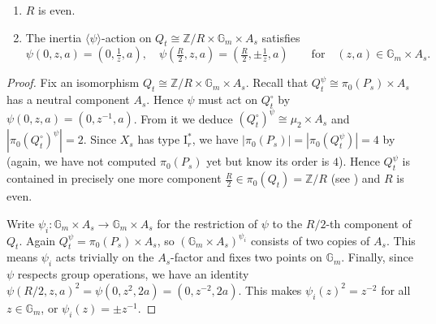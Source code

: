 \documentclass[reqno, letterpaper]{amsart}
\numberwithin{equation}{subsection}
\let\to\longrightarrow
\newcommand{\GG}{\mathbb{G}}
\newcommand{\ZZ}{\mathbb{Z}}
\begin{document}
			\begin{corollary} \label{cor:semistable reduction theorem:psi-action on neutral}
				\begin{enumerate}
					\item $R$ is even.
					\item The inertia $\langle \psi \rangle$-action on $Q_t \cong \ZZ/R \times \GG_m \times A_s$ satisfies
					\[ \psi(0,z,a) = (0,\tfrac{1}{z},a) ,\quad \psi(\tfrac{R}{2},z,a) = (\tfrac{R}{2},\pm \tfrac{1}{z},a) \qquad\mbox{for}\quad (z,a) \in \GG_m \times A_s .\]
				\end{enumerate}
			\end{corollary}
			\begin{proof}
				Fix an isomorphism $Q_t \cong \ZZ/R \times \GG_m \times A_s$. Recall that $Q_t^\psi \cong \pi_0(P_s) \times A_s$ has a neutral component $A_s$. Hence $\psi$ must act on $Q_t^\circ$ by $\psi(0,z,a) = (0,z^{-1},a)$. From it we deduce $(Q_t^\circ)^\psi \cong \mu_2 \times A_s$ and $|\pi_0(Q_t^\circ)^\psi| = 2$. Since $X_s$ has type $\mathrm I_r^*$, we have $|\pi_0(P_s)| = |\pi_0(Q_t^\psi)| = 4$ by  (again, we have not computed $\pi_0(P_s)$ yet but know its order is $4$). Hence $Q_t^\psi$ is contained in precisely one more component $\frac{R}{2} \in \pi_0 (Q_t) = \ZZ/R$ (see \cite[Remark~5.4.1]{edi92}) and $R$ is even.
				
				\medskip
				
				Write $\psi_i : \GG_m \times A_s \to \GG_m \times A_s$ for the restriction of $\psi$ to the $R/2$-th component of $Q_t$. Again $Q_t^\psi = \pi_0(P_s) \times A_s$, so $(\GG_m \times A_s)^{\psi_i}$ consists of two copies of $A_s$. This means $\psi_i$ acts trivially on the $A_s$-factor and fixes two points on $\GG_m$. Finally, since $\psi$ respects group operations, we have an identity $\psi(R/2,z,a)^2 = \psi(0, z^2, 2a) = (0, z^{-2}, 2a)$. This makes $\psi_i(z)^2 = z^{-2}$ for all $z \in \GG_m$, or $\psi_i(z) = \pm z^{-1}$.
			\end{proof}
			
\end{document}
